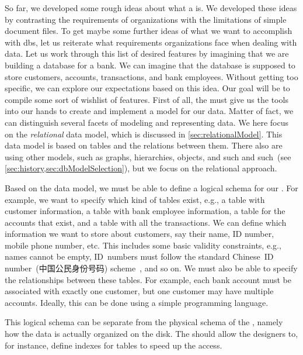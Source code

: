 %
\label{sec:features}%
%
So far, we developed some rough ideas about what a  is.
We developed these ideas by contrasting the requirements of organizations with the limitations of simple document files.
To get maybe some further ideas of what we want to accomplish with \glspl{db}, let us reiterate what requirements organizations face when dealing with data.
Let us work through this list of desired features by imagining that we are building a database for a bank.
We can imagine that the database is supposed to store customers, accounts, transactions, and bank employees.
Without getting too specific, we can explore our expectations based on this idea.
Our goal will be to compile some sort of wishlist of features.%
%
%
First of all, the  must give us the tools into our hands to create and implement a model for our data.
Matter of fact, we can distinguish several facets of modeling and representing data.
We here focus on the \emph{relational} data model, which is discussed in \cref{sec:relationalModel}.
This data model is based on tables and the relations between them.
There also are  using other models, such as graphs, hierarchies, objects, and such and such~(see \cref{sec:history,sec:dbModelSelection}), but we focus on the relational approach.

Based on the data model, we must be able to define a logical schema for our .
For example, we want to specify which kind of tables exist, e.g., a table with customer information, a table with bank employee information, a table for the accounts that exist, and a table with all the transactions.
We can define which information we want to store about customers, say their name, ID number, mobile phone number, etc.
This includes some basic validity constraints, e.g., names cannot be empty, ID~numbers must follow the standard Chinese~ID number~(中国公民身份号码) scheme~\cite{GB116431999CIN}, and so on.
We must also be able to specify the relationships between these tables.
For example, each bank account must be associated with exactly one customer, but one customer may have multiple accounts.
Ideally, this can be done using a simple programming language.

This logical schema can be separate from the physical schema of the , namely how the data is actually organized on the disk.
The  should allow the  designers to, for instance, define indexes for tables to speed up the access.

